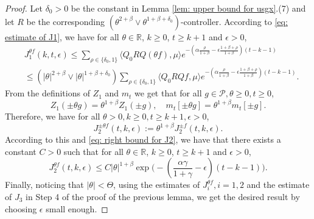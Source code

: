 \documentclass[12pt,a4paper]{amsart}
\theoremstyle{plain}
\theoremstyle{definition}
\numberwithin{equation}{section}
\begin{document}
\begin{proof}
    Let $\delta_0 >0$ be the constant in Lemma \ref{lem: upper bound for usgx}.(7) and let $R$ be the corresponding $(\theta^{2+\beta}\vee \theta^{1+\beta+\delta_0})$-controller.
	According to \eqref{eq: estimate of J1}, we have for all $\theta\in \mathbb R$, $k\geq 0$, $t\geq k+1$ and $\epsilon> 0$,
\begin{align}
    &J^{\theta f}_1(k,t,\epsilon)
    \leq \sum_{\rho \in \{\delta_0,1\}} \langle Q_0 RQ(\theta f), \mu \rangle e^{-(\alpha\frac{\rho}{1+\beta}-\epsilon\frac{1+\beta+\rho}{1+\beta})(t-k-1)}
    \\& \leq(|\theta|^{2+\beta}\vee |\theta|^{1+\beta+\delta_0}) \sum_{\rho \in \{\delta_0,1\}} \langle Q_0 RQf, \mu \rangle e^{-(\alpha\frac{\rho}{1+\beta}-\epsilon\frac{1+\beta+\rho}{1+\beta})(t-k-1)}.
\end{align}
	From the definitions of $Z_1$ and $m_t$ we get that for all $g\in \mathcal P, \theta \geq 0, t\geq 0$,
\[
	Z_1( \pm \theta g) = \theta^{1+\beta} Z_1(\pm g), \quad m_t[\pm \theta g] = \theta^{1+\beta} m_t[\pm g].
\]
	Therefore, we have for all $\theta >0, k \geq 0, t\geq k+1, \epsilon > 0$,
\[
    J^{\pm \theta f}_2(t,k,\epsilon)
	:= \theta^{1+\beta} J_2^{\pm f}(t,k,\epsilon).
\]
	According to this and \eqref{eq: right bound for J2},
	we have that there exists a constant $C > 0$ such that for all $\theta\in \mathbb R$, $k\geq 0$, $t\geq k+1$ and $\epsilon> 0$,
\begin{equation}
\label{eq:31step3b}
    J^{\theta f}_2(t,k,\epsilon)
    \leq C |\theta|^{1+\beta}\exp\Big(-(\frac{\alpha\gamma}{1+\gamma}-\epsilon)(t-k-1)\Big).
\end{equation}
	Finally, noticing that $|\theta| < \Theta$, using the estimates of $J^{\theta f}_{i}, i = 1,2$ and the estimate of $J_3$ in Step 4 of the proof of the previous lemma, we get the desired result by choosing $\epsilon$ small enough.
\end{proof}
\end{document}
